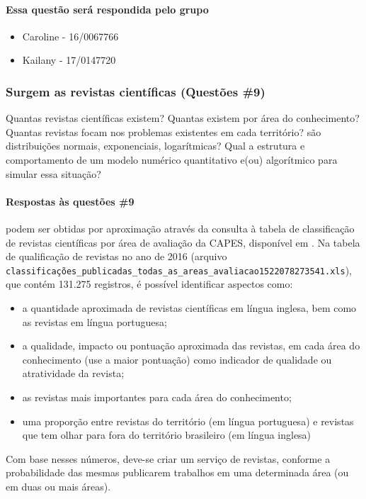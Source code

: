 \paragraph{Essa questão será respondida pelo grupo} 
\begin{itemize}
    \item Caroline - 16/0067766
    \item Kailany - 17/0147720
\end{itemize}

\subsubsection{Surgem as revistas científicas (Questões \#9)}
Quantas revistas científicas existem? Quantas existem por área do conhecimento? Quantas revistas focam nos problemas existentes em cada território? são distribuições normais,  exponenciais, logarítmicas? Qual a estrutura e comportamento de um modelo numérico quantitativo e(ou) algorítmico para simular essa situação?

\paragraph{Respostas às questões \#9} 
podem ser obtidas por aproximação através da consulta à tabela de classificação de revistas científicas por área de avaliação da CAPES, disponível em \cite{capes_qualis_2016}. Na tabela de qualificação de revistas no ano de 2016 (arquivo 
\texttt{classificações\_publicadas\_todas\_as\_areas\_avaliacao1522078273541.xls}), que contém 131.275 registros, é possível identificar aspectos como:
\begin{itemize}
    \item a quantidade aproximada de revistas científicas em língua inglesa, bem como as revistas em língua portuguesa;  
    \item a qualidade, impacto ou pontuação aproximada das revistas, em cada área do conhecimento (use a maior pontuação) como indicador de qualidade ou atratividade da revista;
    \item as revistas mais importantes para cada área do conhecimento;
    \item uma proporção entre revistas do território (em língua portuguesa) e revistas que tem olhar para fora do território brasileiro (em língua inglesa)
\end{itemize}
Com base nesses números, deve-se criar um serviço de revistas, conforme a probabilidade das mesmas publicarem trabalhos em uma determinada área (ou em duas ou mais áreas).


